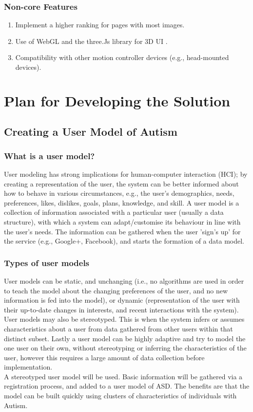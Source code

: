 \documentclass[a4paper, 11pt]{article}
\begin{document}
\subsubsection{Non-core Features}
\begin{enumerate}

\item Implement a higher ranking for pages with most images. 
\item Use of WebGL and the three.Js library for 3D UI .
\item Compatibility with other motion controller devices (e.g., head-mounted devices).

\end{enumerate}

\section{Plan for Developing the Solution}

\subsection {Creating a User Model of Autism}\label{usermodel}
\subsubsection{What is a user model?}
User modeling has strong implications for human-computer interaction (HCI); by creating a representation of the user, the system can be better informed about how to behave in various circumstances, e.g., the user’s demographics, needs, preferences, likes, dislikes, goals, plans, knowledge, and skill. A user model is a collection of information associated with a particular user (usually a data structure), with which a system can adapt/customise its behaviour in line with the user’s needs. The information can be gathered when the user 'sign's up' for the service (e.g., Google+, Facebook), and starts the formation of a data model. \\

\subsubsection{Types of user models}
User models can be static, and unchanging (i.e., no algorithms are used in order to teach the model about the changing preferences of the user, and no new information is fed into the model), or dynamic (representation of the user with their up-to-date changes in interests, and recent interactions with the system). User models may also be stereotyped. This is when the system infers or assumes characteristics about a user from data gathered from other users within that distinct subset. Lastly a user model can be highly adaptive and try to model the one user on their own, without stereotyping or inferring the characteristics of the user, however this requires a large amount of data collection before implementation.\\
A stereotyped user model will be used. Basic information will be gathered via a registration process, and added to a user model of ASD. The benefits are that the model can be built quickly using clusters of characteristics of individuals with Autism.
\end{document}
